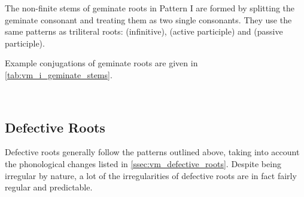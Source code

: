 \documentclass[grammar]{subfiles}
\begin{document}
The non-finite stems of geminate roots in Pattern I are formed by splitting the
geminate consonant and treating them as two single consonants.  They use the
same patterns as triliteral roots:   (infinitive), 
(active participle) and  (passive participle). 

Example conjugations of geminate roots are given in
\cref{tab:vm_i_geminate_stems}.


\begin{table}[h!]\small\capstart
  \centering
  \\
  \caption{Pattern I geminate stems \label{tab:vm_i_geminate_stems}}
\end{table}


\subsection{Defective Roots}
\label{ssec:vm_i_defective}

Defective roots generally follow the patterns outlined above, taking into
account the phonological changes listed in \cref{ssec:vm_defective_roots}.
Despite being irregular by nature, a lot of the irregularities of defective
roots are in fact fairly regular and predictable. 
\end{document}
